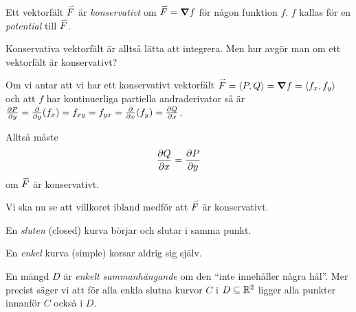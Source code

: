 \documentclass[a4paper]{article}
\begin{document}
\begin{defn}
    Ett vektorfält \(
        \accentset{\rightharpoonup}{F}
    \) är \emph{konservativt} om \(
        \accentset{\rightharpoonup}{F} = \grad f
    \) för någon funktion \(
        f
    \). \(
        f
    \) kallas för en \emph{potential} till \(
        \accentset{\rightharpoonup}{F}
    \).
\end{defn}

Konservativa vektorfält är alltså lätta att integrera. Men hur avgör man om ett
vektorfält är konservativt? 

\begin{sats}
    Om vi antar att vi har ett konservativt vektorfält \(
        \accentset{\rightharpoonup}{F} = \left\langle P, Q\right\rangle = \grad f = \left\langle f_x, f_y\right\rangle
    \) och att \(
        f
    \) har kontinuerliga partiella andraderivator så är \(
        \pdv{P}{y} = \pdv{y}(f_x) = f_{xy} = f_{yx} = \pdv{x}(f_y) = \pdv{Q}{x}
    \).

    Alltså måste \[
        \pdv{Q}{x} = \pdv{P}{y}
    \] om \(
        \accentset{\rightharpoonup}{F}
    \) är konservativt.
\end{sats}

Vi ska nu se att villkoret ibland medför att \(
    \accentset{\rightharpoonup}{F}
\) är konservativt. 

\begin{defn}
    En \emph{sluten} (closed) kurva börjar och slutar i samma punkt.
\end{defn}

\begin{defn}
    En \emph{enkel} kurva (simple) korsar aldrig sig själv.
\end{defn}

\begin{defn}
    En mängd \(
        D
    \) är \emph{enkelt sammanhängande} om den 
    \enquote{inte innehåller några hål}. Mer precist säger vi att för alla 
    enkla slutna kurvor \(
        C
    \) i \(
        D \subseteq \mathbb{R}^2
    \) ligger alla punkter innanför \(
        C
    \) också i \(
        D
    \).
\end{defn}
\end{document}
